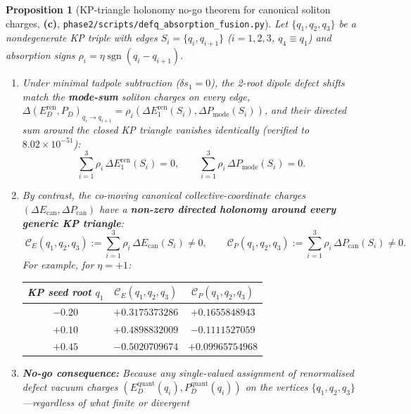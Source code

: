 \documentclass[11pt,a4paper]{article}
\newcommand{\Lc}{\textsf{\textbf{(c)}}}
\newcommand{\sgn}{\operatorname{sgn}}
\newcommand{\sfus}{\texttt{phase2/\allowbreak scripts/\allowbreak defq\_\allowbreak absorption\_\allowbreak fusion.py}}
\newtheorem{proposition}{Proposition}[section]
\theoremstyle{remark}
\begin{document}
\begin{proposition}[KP-triangle holonomy no-go theorem for canonical soliton charges, \Lc, \sfus]\label{prop:holonomy_nogo}
Let $\{q_1,q_2,q_3\}$ be a nondegenerate KP triple with edges $S_i = \{q_i,q_{i+1}\}$
($i=1,2,3$, $q_4\equiv q_1$) and absorption signs $\rho_i = \eta\sgn(q_i-q_{i+1})$.
\begin{enumerate}
\item Under minimal tadpole subtraction ($\delta s_1 = 0$), the 2-root dipole
defect shifts match the \textbf{mode-sum} soliton charges on every edge,
$\Delta(E_D^{\mathrm{ren}},P_D)_{q_i\to q_{i+1}} = \rho_i(\Delta E_1^{\mathrm{ren}}(S_i),\Delta P_{\mathrm{mode}}(S_i))$,
and their directed sum around the closed KP triangle vanishes identically
(verified to $8.02\times 10^{-51}$):
\begin{equation}\label{eq:mode_holonomy_zero}
  \sum_{i=1}^3 \rho_i\,\Delta E_1^{\mathrm{ren}}(S_i) = 0, \qquad
  \sum_{i=1}^3 \rho_i\,\Delta P_{\mathrm{mode}}(S_i) = 0.
\end{equation}
\item By contrast, the co-moving canonical collective-coordinate charges
$(\Delta E_{\mathrm{can}},\Delta P_{\mathrm{can}})$ have a \textbf{non-zero
directed holonomy around every generic KP triangle}:
\begin{equation}\label{eq:can_holonomy_nonzero}
  \boxed{\;
  \mathcal{C}_E(q_1,q_2,q_3) := \sum_{i=1}^3 \rho_i\,\Delta E_{\mathrm{can}}(S_i) \ne 0, \qquad
  \mathcal{C}_P(q_1,q_2,q_3) := \sum_{i=1}^3 \rho_i\,\Delta P_{\mathrm{can}}(S_i) \ne 0.
  \;}
\end{equation}
For example, for $\eta=+1$:
\begin{center}\small
\begin{tabular}{@{}ccc@{}}\toprule
KP seed root $q_1$ & $\mathcal{C}_E(q_1,q_2,q_3)$ & $\mathcal{C}_P(q_1,q_2,q_3)$ \\\midrule
$-0.20$ & $+0.3175373286$ & $+0.1655848943$ \\
$+0.10$ & $+0.4898832009$ & $-0.1111527059$ \\
$+0.45$ & $-0.5020709674$ & $+0.09965754968$ \\\bottomrule
\end{tabular}
\end{center}
\item \textbf{No-go consequence:} Because any single-valued assignment of
renormalised defect vacuum charges $(E_D^{\mathrm{quant}}(q_i),P_D^{\mathrm{quant}}(q_i))$
on the vertices $\{q_1,q_2,q_3\}$---regardless of what finite or divergent

\end{enumerate}
\end{proposition}
\end{document}
